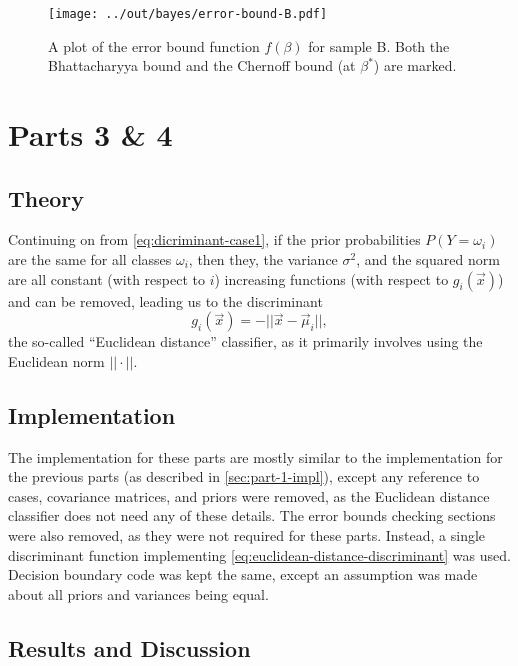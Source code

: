 \documentclass[headings=optiontoheadandtoc,listof=totoc,parskip=full]{scrartcl}
\begin{document}
\begin{figure}[H]
	\centering
	\texttt{[image: ../out/bayes/error-bound-B.pdf]}
	\caption{A plot of the error bound function $f(\beta)$ for sample B. Both the Bhattacharyya bound and the Chernoff bound (at $\beta^*$) are marked.}
	\label{fig:error-bound-B}
\end{figure}


\section{Parts 3 \& 4}
\label{sec:part-2}

\subsection{Theory}
\label{sec:part-2-theory}

Continuing on from \cref{eq:dicriminant-case1}, if the prior probabilities $P(Y = \omega_i)$ are the same for all classes $\omega_i$, then they, the variance $\sigma^2$, and the squared norm are all constant (with respect to $i$) increasing functions (with respect to $g_i(\vec x)$) and can be removed, leading us to the discriminant
\begin{equation}
	g_i(\vec x) = -||\vec x - \vec\mu_i||, \label{eq:euclidean-distance-discriminant}
\end{equation}
the so-called ``Euclidean distance'' classifier, as it primarily involves using the Euclidean norm $||\cdot||$.

\subsection{Implementation}
\label{sec:part-2-impl}

The implementation for these parts are mostly similar to the implementation for the previous parts (as described in \cref{sec:part-1-impl}), except any reference to cases, covariance matrices, and priors were removed, as the Euclidean distance classifier does not need any of these details. The error bounds checking sections were also removed, as they were not required for these parts. Instead, a single discriminant function implementing \cref{eq:euclidean-distance-discriminant} was used. Decision boundary code was kept the same, except an assumption was made about all priors and variances being equal.

\subsection{Results and Discussion}
\end{document}
